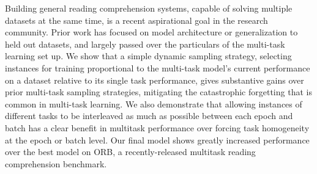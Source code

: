 Building general reading comprehension systems, capable of solving multiple datasets at the same time, is a recent aspirational goal in the research community. Prior work has focused on model architecture or generalization to held out datasets, and largely passed over the particulars of the multi-task learning set up. We show that a simple dynamic sampling strategy, selecting instances for training proportional to the multi-task model's current performance on a dataset relative to its single task performance, gives substantive gains over prior multi-task sampling strategies, mitigating the catastrophic forgetting that is common in multi-task learning. We also demonstrate that allowing instances of different tasks to be interleaved as much as possible between each epoch and batch has a clear benefit in multitask performance over forcing task homogeneity at the epoch or batch level. Our final model shows greatly increased performance over the best model on ORB, a recently-released multitask reading comprehension benchmark.
